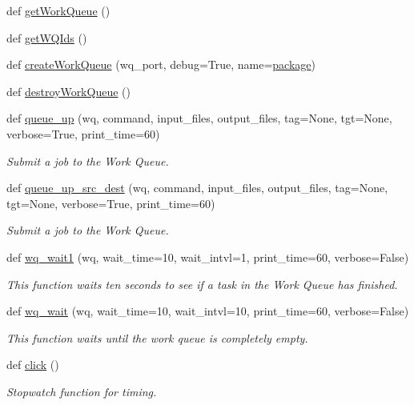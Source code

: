 \begin{DoxyCompactItemize}
def \hyperlink{namespacesrc_1_1nifty_aa26be058ed4503aa168d81f9076aefc3}{get\+Work\+Queue} ()
\item 
def \hyperlink{namespacesrc_1_1nifty_aeafa6a382b79659b374ba813160e4589}{get\+W\+Q\+Ids} ()
\item 
def \hyperlink{namespacesrc_1_1nifty_a262a760d693a4633e0b0474912654cce}{create\+Work\+Queue} (wq\+\_\+port, debug=True, name=\hyperlink{namespacesrc_1_1nifty_a4c9c65626bf4784905a24e3669495270}{package})
\item 
def \hyperlink{namespacesrc_1_1nifty_acb6e901ddc75a719c456d75db970f02d}{destroy\+Work\+Queue} ()
\item 
def \hyperlink{namespacesrc_1_1nifty_a1e3f0a07d4cb01636522cbef8b1e8c72}{queue\+\_\+up} (wq, command, input\+\_\+files, output\+\_\+files, tag=None, tgt=None, verbose=True, print\+\_\+time=60)
\begin{DoxyCompactList}\small\item\em Submit a job to the Work Queue. \end{DoxyCompactList}\item 
def \hyperlink{namespacesrc_1_1nifty_a97302db1fa00ef304d343fb9ad350734}{queue\+\_\+up\+\_\+src\+\_\+dest} (wq, command, input\+\_\+files, output\+\_\+files, tag=None, tgt=None, verbose=True, print\+\_\+time=60)
\begin{DoxyCompactList}\small\item\em Submit a job to the Work Queue. \end{DoxyCompactList}\item 
def \hyperlink{namespacesrc_1_1nifty_a751edc0be54afcd841c93b4132cfb291}{wq\+\_\+wait1} (wq, wait\+\_\+time=10, wait\+\_\+intvl=1, print\+\_\+time=60, verbose=False)
\begin{DoxyCompactList}\small\item\em This function waits ten seconds to see if a task in the Work Queue has finished. \end{DoxyCompactList}\item 
def \hyperlink{namespacesrc_1_1nifty_a1f6829e41379fd0b24c3cc2f4d6a8036}{wq\+\_\+wait} (wq, wait\+\_\+time=10, wait\+\_\+intvl=10, print\+\_\+time=60, verbose=False)
\begin{DoxyCompactList}\small\item\em This function waits until the work queue is completely empty. \end{DoxyCompactList}\item 
def \hyperlink{namespacesrc_1_1nifty_a2e2c25836c0f02766509a55a38b21c09}{click} ()
\begin{DoxyCompactList}\small\item\em Stopwatch function for timing. \end{DoxyCompactList}\item 

\end{DoxyCompactItemize}

